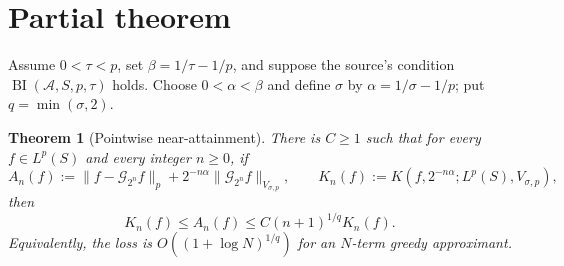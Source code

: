 \documentclass[10pt]{article}
\newtheorem{theorem}{Theorem}
\newcommand{\G}{\mathscr G}
\newcommand{\V}{V_{\sigma,p}}
\newcommand{\norm}[1]{\lVert #1\rVert}
\begin{document}
\section*{Partial theorem}

Assume $0<\tau<p$, set $\beta=1/\tau-1/p$, and suppose the source's
condition $\operatorname{BI}(\mathscr A,S,p,\tau)$ holds.  Choose
$0<\alpha<\beta$ and define $\sigma$ by
$\alpha=1/\sigma-1/p$; put $q=\min(\sigma,2)$.

\begin{theorem}[Pointwise near-attainment]\label{thm:main}
There is $C\ge1$ such that for every $f\in L^p(S)$ and every integer
$n\ge0$, if
\[
 A_n(f):=\norm{f-\G_{2^n}f}_p
  +2^{-n\alpha}\norm{\G_{2^n}f}_{\V},
 \qquad
 K_n(f):=K(f,2^{-n\alpha};L^p(S),\V),
\]
then
\begin{equation}\label{eq:main}
 K_n(f)\le A_n(f)\le C(n+1)^{1/q}K_n(f).
\end{equation}
Equivalently, the loss is
$O((1+\log N)^{1/q})$ for an $N$-term greedy approximant.
\end{theorem}
\end{document}
